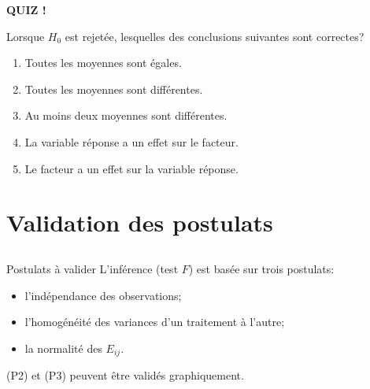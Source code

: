 \documentclass{BeamerTemplate}
\begin{document}
\begin{frame}[t]{ }

\centerline{\LARGE\bf \alert{QUIZ !}}
\bigskip

Lorsque $H_0$ est rejetée, lesquelles des conclusions suivantes sont correctes?

\bigskip

\begin{enumerate}[$\square$]\itemsep 3mm
\item Toutes les moyennes sont égales.
\item Toutes les moyennes sont différentes.
\item Au moins deux moyennes sont différentes.
\item La variable réponse a un effet sur le facteur.
\item Le facteur a un effet sur la variable réponse.
\end{enumerate}

\vspace{3mm}


\end{frame}


\section{Validation des postulats}
\subsection*{ }
\begin{frame}[t]{Postulats à valider}
L'inférence (test $F$) est basée sur trois postulats:
\begin{itemize}
\item[(P1)] l'indépendance des observations;
\item[(P2)] l'homogénéité des variances d'un traitement à l'autre;
\item[(P3)] la normalité des $E_{ij}$.
\end{itemize}

(P2) et (P3) peuvent être validés graphiquement.\\


\medskip
{}
\end{frame}
\end{document}
